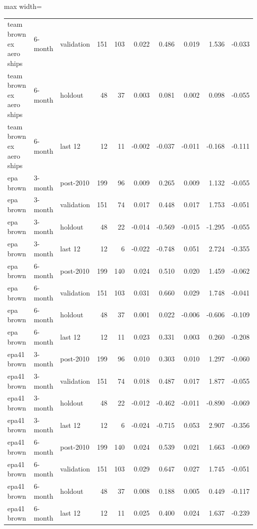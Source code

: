 \begin{table}[H]
\begin{adjustbox}{max width=\linewidth}
\begin{tabular}{lllrrrrrrr}
team brown ex aero ships & 6-month & validation & 151 & 103 & 0.022 & 0.486 & 0.019 & 1.536 & -0.033 \\
team brown ex aero ships & 6-month & holdout & 48 & 37 & 0.003 & 0.081 & 0.002 & 0.098 & -0.055 \\
team brown ex aero ships & 6-month & last 12 & 12 & 11 & -0.002 & -0.037 & -0.011 & -0.168 & -0.111 \\
epa brown & 3-month & post-2010 & 199 & 96 & 0.009 & 0.265 & 0.009 & 1.132 & -0.055 \\
epa brown & 3-month & validation & 151 & 74 & 0.017 & 0.448 & 0.017 & 1.753 & -0.051 \\
epa brown & 3-month & holdout & 48 & 22 & -0.014 & -0.569 & -0.015 & -1.295 & -0.055 \\
epa brown & 3-month & last 12 & 12 & 6 & -0.022 & -0.748 & 0.051 & 2.724 & -0.355 \\
epa brown & 6-month & post-2010 & 199 & 140 & 0.024 & 0.510 & 0.020 & 1.459 & -0.062 \\
epa brown & 6-month & validation & 151 & 103 & 0.031 & 0.660 & 0.029 & 1.748 & -0.041 \\
epa brown & 6-month & holdout & 48 & 37 & 0.001 & 0.022 & -0.006 & -0.606 & -0.109 \\
epa brown & 6-month & last 12 & 12 & 11 & 0.023 & 0.331 & 0.003 & 0.260 & -0.208 \\
epa41 brown & 3-month & post-2010 & 199 & 96 & 0.010 & 0.303 & 0.010 & 1.297 & -0.060 \\
epa41 brown & 3-month & validation & 151 & 74 & 0.018 & 0.487 & 0.017 & 1.877 & -0.055 \\
epa41 brown & 3-month & holdout & 48 & 22 & -0.012 & -0.462 & -0.011 & -0.890 & -0.069 \\
epa41 brown & 3-month & last 12 & 12 & 6 & -0.024 & -0.715 & 0.053 & 2.907 & -0.356 \\
epa41 brown & 6-month & post-2010 & 199 & 140 & 0.024 & 0.539 & 0.021 & 1.663 & -0.069 \\
epa41 brown & 6-month & validation & 151 & 103 & 0.029 & 0.647 & 0.027 & 1.745 & -0.051 \\
epa41 brown & 6-month & holdout & 48 & 37 & 0.008 & 0.188 & 0.005 & 0.449 & -0.117 \\
epa41 brown & 6-month & last 12 & 12 & 11 & 0.025 & 0.400 & 0.024 & 1.637 & -0.239 \\
\bottomrule
\end{tabular}
\end{adjustbox}
\end{table}
